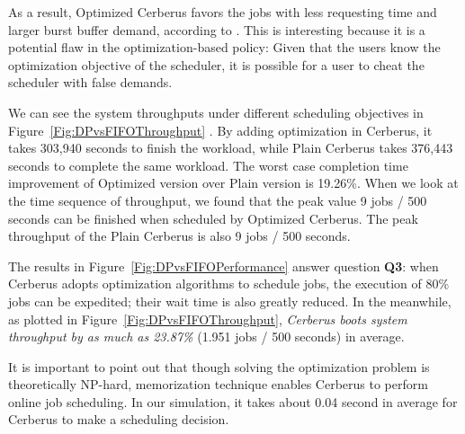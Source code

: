 As a result, Optimized Cerberus favors the jobs with less requesting time and larger burst buffer demand,
according to .
This is interesting because it is a potential flaw in the optimization-based policy:
Given that the users know the optimization objective of the scheduler,
it is possible for a user to cheat the scheduler with false demands.


We can see the system throughputs under different scheduling objectives in Figure~\ref{Fig:DPvsFIFOThroughput} .
By adding optimization in Cerberus, it takes 303,940 seconds to finish the workload,
while Plain Cerberus takes 376,443 seconds to complete the same workload.
The worst case completion time improvement of Optimized version over Plain version is 19.26\%.
When we look at the time sequence of throughput,
we found that the peak value 9 jobs / 500 seconds can be finished when scheduled by Optimized Cerberus.
The peak throughput of the Plain Cerberus is also 9 jobs / 500 seconds.

The results in Figure~\ref{Fig:DPvsFIFOPerformance} answer question \textbf{Q3}: 
when Cerberus adopts optimization algorithms to schedule jobs,
the execution of 80\% jobs can be expedited; their wait time is also greatly reduced.
In the meanwhile, as plotted in Figure~\ref{Fig:DPvsFIFOThroughput},
\textit{Cerberus boots system throughput by as much as 23.87\%} (1.951 jobs / 500 seconds) in average.

It is important to point out that
though solving the optimization problem is theoretically NP-hard,
memorization technique enables Cerberus to perform online job scheduling.
In our simulation, it takes about 0.04 second in average for Cerberus to make a scheduling decision.



